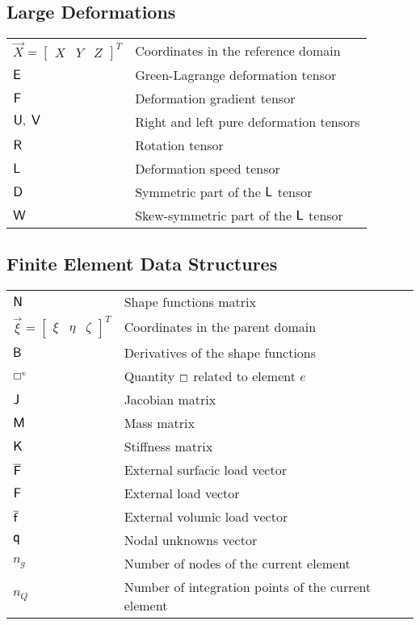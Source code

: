 \subsection*{Large Deformations\vspace{-1ex}}

\begin{longtable}[l]{>{\raggedright}p{0.2\paperwidth}>{\raggedright}p{0.8\paperwidth}}
$\overrightarrow{X}=\left[\begin{array}{ccc}
X & Y & Z\end{array}\right]^{T}$ & Coordinates in the reference domain\tabularnewline
$\mbox{\large\ensuremath{\mathsf{E}}}$ & Green-Lagrange deformation tensor\tabularnewline
$\mbox{\large\ensuremath{\mathsf{F}}}$ & Deformation gradient tensor\tabularnewline
$\U,\ \V$ & Right and left pure deformation tensors\tabularnewline
$\mbox{\large\ensuremath{\mathsf{R}}}$ & Rotation tensor\tabularnewline
$\mbox{\large\ensuremath{\mathsf{L}}}$ & Deformation speed tensor\tabularnewline
$\mbox{\large\ensuremath{\mathsf{D}}}$ &Symmetric part of the $\mbox{\large\ensuremath{\mathsf{L}}}$ tensor\tabularnewline
$\mbox{\large\ensuremath{\mathsf{W}}}$ & Skew-symmetric part of the $\mbox{\large\ensuremath{\mathsf{L}}}$ tensor\tabularnewline
\end{longtable}

\subsection*{Finite Element Data Structures\vspace{-1ex}}
\begin{flushleft}
\begin{longtable}[l]{>{\raggedright}p{0.2\paperwidth}>{\raggedright}p{0.8\paperwidth}}
$\mbox{\large\ensuremath{\mathsf{N}}}$ &Shape functions matrix\tabularnewline
$\overrightarrow{\xi}=\left[\begin{array}{ccc}
\xi & \eta & \zeta\end{array}\right]^{T}$ & Coordinates in the parent domain\tabularnewline
$\mbox{\large\ensuremath{\mathsf{B}}}$ & Derivatives of the shape functions\tabularnewline
$\boxempty^{e}$ & Quantity $\boxempty$ related to element $e$\tabularnewline
$\mbox{\large\ensuremath{\mathsf{J}}}$ & Jacobian matrix\tabularnewline
$\mbox{\large\ensuremath{\mathsf{M}}}$ & Mass matrix\tabularnewline
$\mbox{\large\ensuremath{\mathsf{K}}}$ & Stiffness matrix\tabularnewline
$\overline{\mbox{\large\ensuremath{\mathsf{F}}}}$ & External surfacic load vector\tabularnewline
$\mbox{\large\ensuremath{\mathsf{F}}}$ & External load vector\tabularnewline
$\overline{\mbox{\large\ensuremath{\mathsf{f}}}}$ & External volumic load vector\tabularnewline
$\mbox{\large\ensuremath{\mathsf{q}}}$ & Nodal unknowns vector\tabularnewline
$n_{g}$ & Number of nodes of the current element\tabularnewline
$n_{Q}$ & Number of integration points of the current element\tabularnewline
\end{longtable}
\par\end{flushleft}


